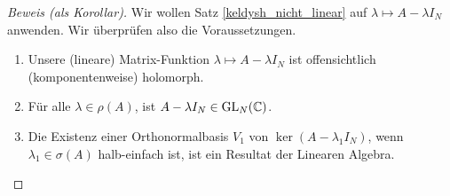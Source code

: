 \begin{proof}[Beweis (als Korollar)]

    Wir wollen Satz \ref{keldysh_nicht_linear} auf $\lambda \mapsto A - \lambda I_N$ anwenden.
    Wir überprüfen also die Voraussetzungen.

    \begin{enumerate}[label = \arabic*.]

        \item Unsere (lineare) Matrix-Funktion $\lambda \mapsto A - \lambda I_N$ ist offensichtlich (komponentenweise) holomorph.

        \item Für alle $\lambda \in \rho(A)$, ist $A - \lambda I_N \in \operatorname{GL}_N(\mathbb{C})$.

        \item Die Existenz einer Orthonormalbasis $V_1$ von $\ker (A - \lambda_1 I_N)$, wenn $\lambda_1 \in \sigma(A)$ halb-einfach ist, ist ein Resultat der Linearen Algebra.
        
        \begin{comment}

            Seien $\lambda_2, \dots, \lambda_k$ die restlichen (paarweise verschiedenen) Eigenwerte von $A$.
            Seien $L_n^\mathrm{geo}$ und $L_n^\mathrm{alg}$ die geometrische bzw. algebraische Vielfachheit von $\lambda_n$ für $n = 2, \dots, k$.
            Betrachte die Jordan Normalform von $A$.
        

\end{comment}
\end{enumerate}
\end{proof}
